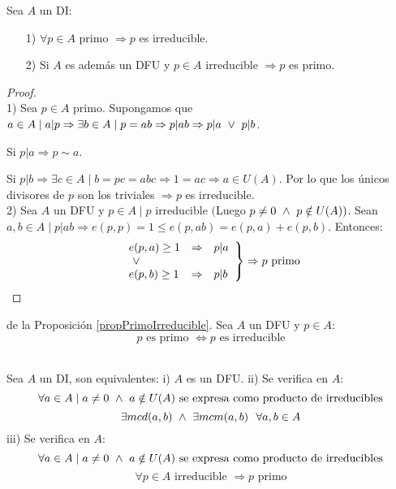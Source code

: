 \begin{prop}
    \label{propPrimoIrreducible}
    Sea $A$ un DI:
    \begin{enumerate}
        \item[1)] $\forall p \in A$ primo $\Rightarrow p$ es irreducible.
        \item[2)] Si $A$ es además un DFU y $p \in A$ irreducible $\Rightarrow p$ es primo.
    \end{enumerate}
\begin{proof}
    \ \\
    1) Sea $p \in A$ primo.\newline
    Supongamos que $a \in A \mid a|p \Rightarrow \exists b \in A \mid p=ab \Rightarrow p|ab \Rightarrow p|a \ \lor \  p|b$.\par
    Si $p|a \Rightarrow p\sim a$.\par
    Si $p|b \Rightarrow \exists c \in A \mid b=pc =abc \Rightarrow 1=ac \Rightarrow a \in U(A)$.\newline
    Por lo que los únicos divisores de $p$ son los triviales $\Rightarrow p$ es irreducible.\\

    
    2) Sea $A$ un DFU y $p \in A \mid p$ irreducible $($Luego $p\neq 0 \ \land \  p \notin U(A))$.\newline
    Sean $a,b \in A \mid p|ab \Rightarrow e(p,p)=1\leq e(p,ab) = e(p,a)+e(p,b)$. Entonces:
    $$\left. \begin{array}{lll}
            e(p,a) \geq 1 & \Rightarrow & p|a \\
            \ \lor \             &             &     \\
            e(p,b) \geq 1 & \Rightarrow & p|b
        \end{array} \right\} \Rightarrow p \mbox{ primo}$$
\end{proof}
\end{prop}


\begin{coro}
    de la Proposición \ref{propPrimoIrreducible}.\newline
    Sea $A$ un DFU y $p \in A$:
    $$p \mbox{ es primo } \Leftrightarrow p \mbox{ es irreducible}$$
\end{coro}

\begin{teo}
    \ \\
    \label{teoCaracDFU}
    Sea $A$ un DI, son equivalentes:\newline
    i) $A$ es un DFU.\newline
    ii) Se verifica en $A$:
    $$\forall a \in A \mid a\neq 0 \ \land \  a \notin U(A) \mbox{ se expresa como producto de irreducibles}$$
    $$\exists mcd(a,b) \ \land \  \exists mcm(a,b)~~\forall a,b \in A$$
    iii) Se verifica en $A$:
    $$\forall a \in A \mid a\neq 0 \ \land \  a \notin U(A) \mbox{ se expresa como producto de irreducibles}$$
    $$\forall p \in A \mbox{ irreducible } \Rightarrow p \mbox{ primo}$$
\end{teo}

